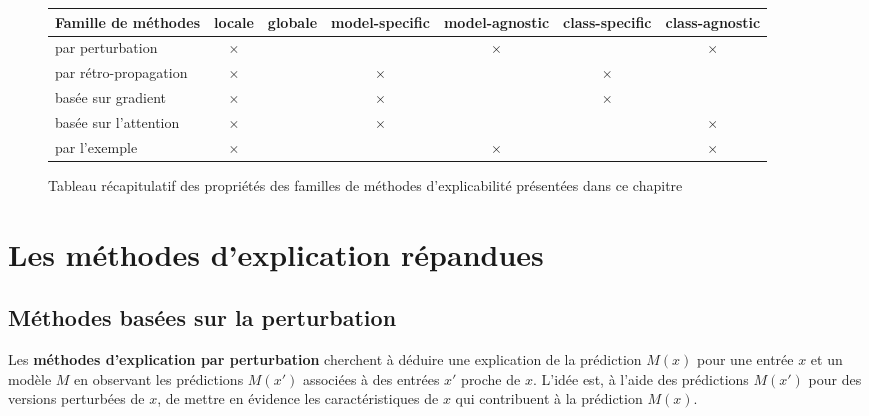 \documentclass{report}
\begin{document}
\begin{figure}
    \centering
    \begin{tabular}{|l||c|c||c|c||c|c|}
        \hline
        Famille de méthodes & locale & globale & model-specific & model-agnostic & class-specific & class-agnostic \\
        \hline
        par perturbation & $\times$ &      &                & $\times$      &                & $\times$  \\
        par rétro-propagation & $\times$ & & $\times$       &               & $\times$      &           \\
        basée sur gradient & $\times$   &  & $\times$       &               & $\times$      &           \\
        basée sur l'attention & $\times$&  & $\times$       &               &               & $\times$  \\
        par l'exemple & $\times$ &         &                & $\times$      &               & $\times$\\
        \hline
        
    \end{tabular}
    \caption{Tableau récapitulatif des propriétés des familles de méthodes d'explicabilité présentées dans ce chapitre}
    \label{fig:recapPropXAIMeth}
\end{figure}

\section{Les méthodes d'explication répandues}
    \label{sec:XAIMeth}

    \subsection{Méthodes basées sur la perturbation}
        
        Les \textbf{méthodes d'explication par perturbation} cherchent à déduire une explication de la prédiction $M(x)$ pour une entrée $x$ et un modèle $M$ en observant les prédictions $M(x')$ associées à des entrées $x'$ proche de $x$. L'idée est, à l'aide des prédictions $M(x')$ pour des versions perturbées de $x$, de mettre en évidence les caractéristiques de $x$ qui contribuent à la prédiction $M(x)$. 
        
\end{document}
